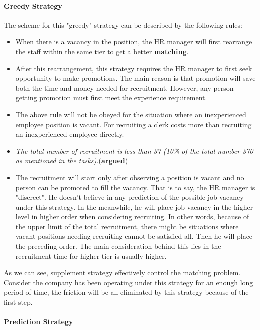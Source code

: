\documentclass[tcn = 37075, sheet = true, abstract = true]{mcmthesis}
\begin{document}
\paragraph{Greedy Strategy}

The scheme for this "greedy" strategy can be described by the following rules:
\begin{itemize}
\item When there is a vacancy in the position, the HR manager will first rearrange the staff within the same tier to get a better \textbf{\Large{matching}}.
\item After this rearrangement, this strategy requires the HR manager to first seek opportunity to make promotions. The main reason is that promotion will save both the time and money needed for recruitment. However, any person getting promotion must first meet the experience requirement.
\item The above rule will not be obeyed for the situation where an inexperienced employee position is vacant. For recruiting a clerk costs more than recruiting an inexperienced employee directly.
\item \textit{The total number of recruitment is less than 37 (10\% of the total number 370 as mentioned in the tasks).}(\textbf{argued})
\item The recruitment will start only after observing a position is vacant and no person can be promoted to fill the vacancy. That is to say, the HR manager is "discreet". He doesn't believe in any prediction of the possible job vacancy under this strategy. In the meanwhile, he will place job vacancy in the higher level in higher order when considering recruiting. In other words, because of the upper limit of the total recruitment, there might be situations where vacant positions needing recruiting cannot be satisfied all. Then he will place the preceding order. The main consideration behind this lies in the recruitment time for higher tier is usually higher.
\end{itemize}

As we can see, supplement strategy effectively control the matching problem. Consider the company has been operating under this strategy for an enough long period of time, the friction will be all eliminated by this strategy because of the first step.

\paragraph{Prediction Strategy}
\end{document}
